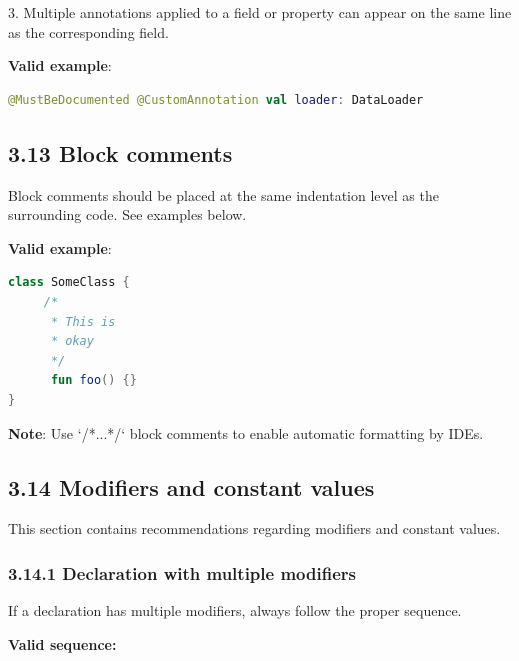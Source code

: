 {{{{3. Multiple annotations applied to a field or property can appear on the same line as the corresponding field.



\textbf{Valid example}:

\begin{lstlisting}[language=Kotlin]
@MustBeDocumented @CustomAnnotation val loader: DataLoader
\end{lstlisting}


\subsection*{\textbf{3.13 Block comments}}

\label{sec:3.13}



Block comments should be placed at the same indentation level as the surrounding code. See examples below.



\textbf{Valid example}:



\begin{lstlisting}[language=Kotlin]
class SomeClass {
     /*
      * This is
      * okay
      */
      fun foo() {}
}
\end{lstlisting}


\textbf{Note}: Use `/*...*/` block comments to enable automatic formatting by IDEs.



\subsection*{\textbf{3.14 Modifiers and constant values}}

\label{sec:3.14}

This section contains recommendations regarding modifiers and constant values.

\subsubsection*{\textbf{3.14.1 Declaration with multiple modifiers}}
\leavevmode\newline

\label{sec:3.14.1}

If a declaration has multiple modifiers, always follow the proper sequence.

\textbf{Valid sequence:}



}}}}

